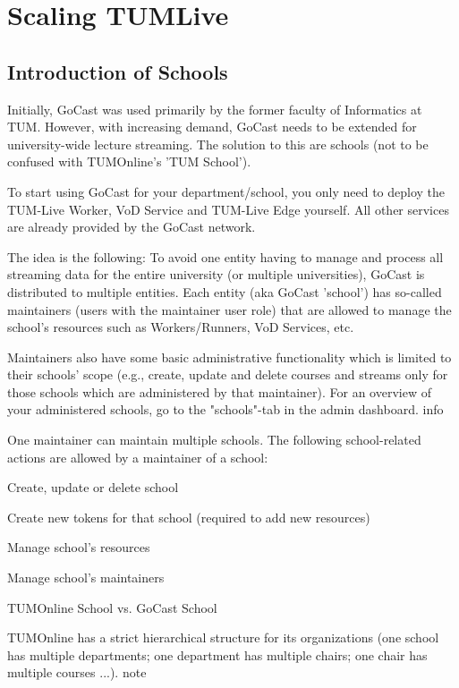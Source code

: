 
\chapter{Scaling TUMLive}\label{chapter:introduction}

\section{Introduction of Schools}

Initially, GoCast was used primarily by the former faculty of Informatics at TUM. However, with increasing demand, GoCast needs to be extended for university-wide lecture streaming. The solution to this are schools (not to be confused with TUMOnline's 'TUM School').

To start using GoCast for your department/school, you only need to deploy the TUM-Live Worker, VoD Service and TUM-Live Edge yourself. All other services are already provided by the GoCast network.

The idea is the following: To avoid one entity having to manage and process all streaming data for the entire university (or multiple universities), GoCast is distributed to multiple entities. Each entity (aka GoCast 'school') has so-called maintainers (users with the maintainer user role) that are allowed to manage the school's resources such as Workers/Runners, VoD Services, etc.

Maintainers also have some basic administrative functionality which is limited to their schools' scope (e.g., create, update and delete courses and streams only for those schools which are administered by that maintainer). For an overview of your administered schools, go to the "schools"-tab in the admin dashboard.
info

One maintainer can maintain multiple schools.
The following school-related actions are allowed by a maintainer of a school:

    Create, update or delete school

    Create new tokens for that school (required to add new resources)

    Manage school's resources

    Manage school's maintainers

TUMOnline School vs. GoCast School

TUMOnline has a strict hierarchical structure for its organizations (one school has multiple departments; one department has multiple chairs; one chair has multiple courses ...).
note

